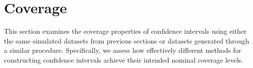 
\section{Coverage}\label{sec:coverage}

This section examines the coverage properties of confidence intervals using either the same simulated datasets from previous sections or datasets generated through a similar procedure. Specifically, we assess how effectively different methods for constructing confidence intervals achieve their intended nominal coverage levels.

